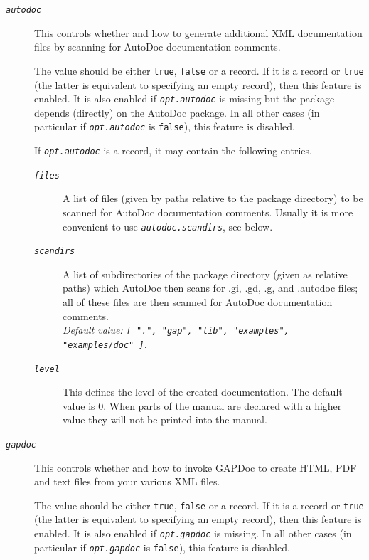 \documentclass[a4paper,11pt]{report}
\begin{document}
{{{\begin{description}
\begin{description}
\item[{\mbox{\texttt{\mdseries\slshape autodoc}}}]  This controls whether and how to generate additional XML documentation files
by scanning for \textsf{AutoDoc} documentation comments. 

 The value should be either \texttt{true}, \texttt{false} or a record. If it is a record or \texttt{true} (the latter is equivalent to specifying an empty record), then this feature is
enabled. It is also enabled if \mbox{\texttt{\mdseries\slshape opt.autodoc}} is missing but the package depends (directly) on the \textsf{AutoDoc} package. In all other cases (in particular if \mbox{\texttt{\mdseries\slshape opt.autodoc}} is \texttt{false}), this feature is disabled. 

 

 If \mbox{\texttt{\mdseries\slshape opt.autodoc}} is a record, it may contain the following entries. 

 
\begin{description}
\item[{\mbox{\texttt{\mdseries\slshape files}}}]  A list of files (given by paths relative to the package directory) to be
scanned for \textsf{AutoDoc} documentation comments. Usually it is more convenient to use \mbox{\texttt{\mdseries\slshape autodoc.scan{\textunderscore}dirs}}, see below. 
\item[{\mbox{\texttt{\mdseries\slshape scan{\textunderscore}dirs}}}]  A list of subdirectories of the package directory (given as relative paths)
which \textsf{AutoDoc} then scans for .gi, .gd, .g, and .autodoc files; all of these files are then
scanned for \textsf{AutoDoc} documentation comments. \\
 \emph{Default value: \texttt{[ ".", "gap", "lib", "examples", "examples/doc" ]}.} 
\item[{\mbox{\texttt{\mdseries\slshape level}}}]  This defines the level of the created documentation. The default value is 0.
When parts of the manual are declared with a higher value they will not be
printed into the manual. 
\end{description}
 
\item[{\mbox{\texttt{\mdseries\slshape gapdoc}}}]  This controls whether and how to invoke \textsf{GAPDoc} to create HTML, PDF and text files from your various XML files. 

 The value should be either \texttt{true}, \texttt{false} or a record. If it is a record or \texttt{true} (the latter is equivalent to specifying an empty record), then this feature is
enabled. It is also enabled if \mbox{\texttt{\mdseries\slshape opt.gapdoc}} is missing. In all other cases (in particular if \mbox{\texttt{\mdseries\slshape opt.gapdoc}} is \texttt{false}), this feature is disabled. 


\end{description}
\end{description}}}}
\end{document}
